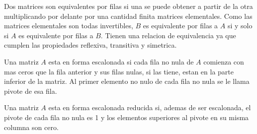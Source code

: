 \begin{definition}
	Dos matrices son equivalentes por filas si una se puede obtener a partir de la otra multiplicando por delante por una cantidad finita matrices elementales. Como las matrices elementales son todas invertibles, \(B \) es equivalente por filas a \(A \) si y solo si \(A \) es equivalente por filas a \(B \). Tienen una relacion de equivalencia ya que cumplen las propiedades reflexiva, transitiva y simetrica.
\end{definition}

\begin{definition}
	Una matriz \(A \) esta en forma escalonada si cada fila no nula de \(A \) comienza con mas ceros que la fila anterior y sus filas nulas, si las tiene,  estan en la parte inferior de la matriz. Al primer elemento no nulo de cada fila no nula se le llama pivote de esa fila.
\end{definition}

\begin{definition}
	Una matriz \(A \) esta en forma escalonada reducida si, ademas de ser escalonada, el pivote de cada fila no nula es 1 y los elementos superiores al pivote en su misma columna son cero.
\end{definition}

